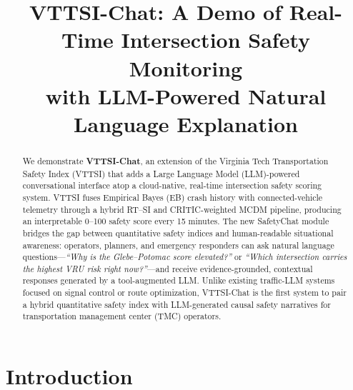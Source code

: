 \documentclass[conference]{IEEEtran}
\begin{document}
\title{VTTSI-Chat: A Demo of Real-Time Intersection Safety Monitoring\\
with LLM-Powered Natural Language Explanation}

\author{
\and
{}
\and
{}
}

\maketitle

\sloppy
\raggedbottom

\begin{abstract}
We demonstrate \textbf{VTTSI-Chat}, an extension of the Virginia Tech Transportation
Safety Index (VTTSI) that adds a Large Language Model (LLM)-powered conversational
interface atop a cloud-native, real-time intersection safety scoring system.
VTTSI fuses Empirical Bayes (EB) crash history with connected-vehicle telemetry
through a hybrid RT--SI and CRITIC-weighted MCDM pipeline, producing an interpretable
0--100 safety score every 15 minutes.
The new SafetyChat module bridges the gap between quantitative safety indices and
human-readable situational awareness: operators, planners, and emergency responders can
ask natural language questions---\emph{``Why is the Glebe--Potomac score elevated?''}
or \emph{``Which intersection carries the highest VRU risk right now?''}---and receive
evidence-grounded, contextual responses generated by a tool-augmented LLM.
Unlike existing traffic-LLM systems focused on signal control or route optimization,
VTTSI-Chat is the first system to pair a hybrid quantitative safety index with
LLM-generated causal safety narratives for transportation management center (TMC) operators.
\end{abstract}

\section{Introduction}
\label{sec:intro}
\end{document}
